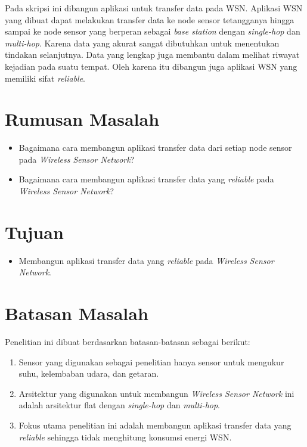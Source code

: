Pada skripsi ini dibangun aplikasi untuk transfer data pada WSN. Aplikasi WSN yang dibuat dapat melakukan transfer data ke node sensor tetangganya hingga sampai ke node sensor yang berperan sebagai \textit{base station} dengan \textit{single-hop} dan \textit{multi-hop}. Karena data yang akurat sangat dibutuhkan untuk menentukan tindakan selanjutnya. Data yang lengkap juga membantu dalam melihat riwayat kejadian pada suatu tempat. Oleh karena itu dibangun juga aplikasi WSN yang memiliki sifat \textit{reliable}.

\section{Rumusan Masalah}
\label{sec:rumusan}
\begin{itemize}
	\item Bagaimana cara membangun aplikasi transfer data dari setiap node sensor pada \textit{Wireless Sensor Network}?
	\item Bagaimana cara membangun aplikasi transfer data yang \textit{reliable} pada \textit{Wireless Sensor Network}?
\end{itemize}

\section{Tujuan}
\label{sec:tujuan}
\begin{itemize}
 \item Membangun aplikasi transfer data yang \textit{reliable} pada \textit{Wireless Sensor Network}.
\end{itemize}

\section{Batasan Masalah}
\label{sec:batasan}
Penelitian ini dibuat berdasarkan batasan-batasan sebagai berikut:
\begin{enumerate}
	\item Sensor yang digunakan sebagai penelitian hanya sensor untuk mengukur suhu, kelembaban udara, dan getaran.
	\item Arsitektur yang digunakan untuk membangun \textit{Wireless Sensor Network} ini adalah arsitektur flat dengan \textit{single-hop} dan \textit{multi-hop}.
	\item Fokus utama penelitian ini adalah membangun aplikasi transfer data yang \textit{reliable} sehingga tidak menghitung konsumsi energi WSN.
\end{enumerate}

